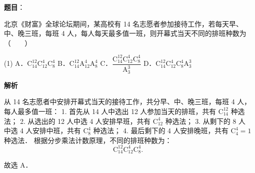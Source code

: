 \begin{answer}

\textbf{题目}：

北京《财富》全球论坛期间，某高校有 14 名志愿者参加接待工作，若每天早、中、晚三班，每班 4 人，每人每天最多值一班，则开幕式当天不同的排班种数为\mbox{（　　）}

\begin{gkopts}(1)
\task A．$\mathrm{C}_{14}^{12}\mathrm{C}_{12}^4\mathrm{C}_8^4$
\task B．$\mathrm{C}_{14}^{12}\mathrm{A}_{12}^4\mathrm{A}_8^4$
\task C．$\dfrac{\mathrm{C}_{14}^{12}\mathrm{C}_{12}^4\mathrm{C}_8^4}{\mathrm{A}_3^3}$
\task D．$\mathrm{C}_{14}^{12}\mathrm{C}_{12}^4\mathrm{C}_8^4\mathrm{A}_3^3$
\end{gkopts}

\textbf{解析}

从 14 名志愿者中安排开幕式当天的接待工作，共分早、中、晚三班，每班 4 人，每人最多值一班：
1. 首先从 14 人中选出 12 人参加当天的排班，共有 $\mathrm{C}_{14}^{12}$ 种选法；
2. 从选出的 12 人中选 4 人安排早班，共有 $\mathrm{C}_{12}^4$ 种选法；
3. 从剩下的 8 人中选 4 人安排中班，共有 $\mathrm{C}_8^4$ 种选法；
4. 最后剩下的 4 人安排晚班，共有 $\mathrm{C}_4^4 = 1$ 种选法．
根据分步乘法计数原理，不同的排班种数为：
\nopagebreak[4]
\[
\mathrm{C}_{14}^{12}\mathrm{C}_{12}^4\mathrm{C}_8^4.
\]

故选 A．


\end{answer}
